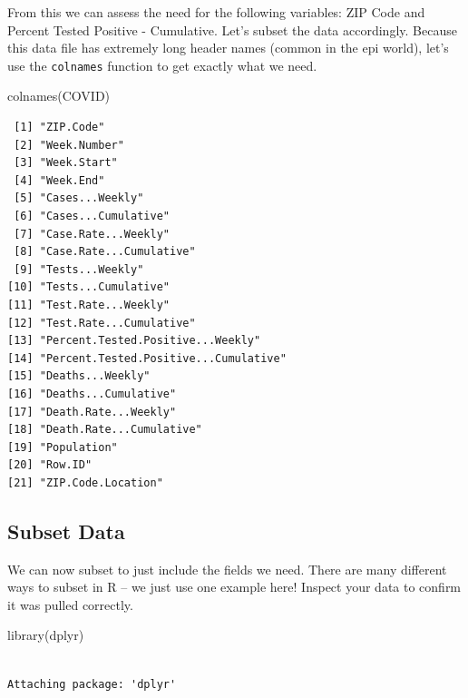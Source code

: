 \documentclass[
  letterpaper,
  DIV=11,
  numbers=noendperiod]{scrreprt}
\newenvironment{Shaded}{\begin{snugshade}}{\end{snugshade}}
\newcommand{\FunctionTok}[1]{\textcolor[rgb]{0.28,0.35,0.67}{#1}}
\newcommand{\NormalTok}[1]{\textcolor[rgb]{0.00,0.23,0.31}{#1}}
\begin{document}
From this we can assess the need for the following variables: ZIP Code
and Percent Tested Positive - Cumulative. Let's subset the data
accordingly. Because this data file has extremely long header names
(common in the epi world), let's use the \texttt{colnames} function to
get exactly what we need.

\begin{Shaded}
\begin{Highlighting}[]
\FunctionTok{colnames}\NormalTok{(COVID)}
\end{Highlighting}
\end{Shaded}

\begin{verbatim}
 [1] "ZIP.Code"                            
 [2] "Week.Number"                         
 [3] "Week.Start"                          
 [4] "Week.End"                            
 [5] "Cases...Weekly"                      
 [6] "Cases...Cumulative"                  
 [7] "Case.Rate...Weekly"                  
 [8] "Case.Rate...Cumulative"              
 [9] "Tests...Weekly"                      
[10] "Tests...Cumulative"                  
[11] "Test.Rate...Weekly"                  
[12] "Test.Rate...Cumulative"              
[13] "Percent.Tested.Positive...Weekly"    
[14] "Percent.Tested.Positive...Cumulative"
[15] "Deaths...Weekly"                     
[16] "Deaths...Cumulative"                 
[17] "Death.Rate...Weekly"                 
[18] "Death.Rate...Cumulative"             
[19] "Population"                          
[20] "Row.ID"                              
[21] "ZIP.Code.Location"                   
\end{verbatim}

\subsection{Subset Data}\label{subset-data}

We can now subset to just include the fields we need. There are many
different ways to subset in R -- we just use one example here! Inspect
your data to confirm it was pulled correctly.

\begin{Shaded}
\begin{Highlighting}[]
\FunctionTok{library}\NormalTok{(dplyr)}
\end{Highlighting}
\end{Shaded}

\begin{verbatim}

Attaching package: 'dplyr'
\end{verbatim}
\end{document}
